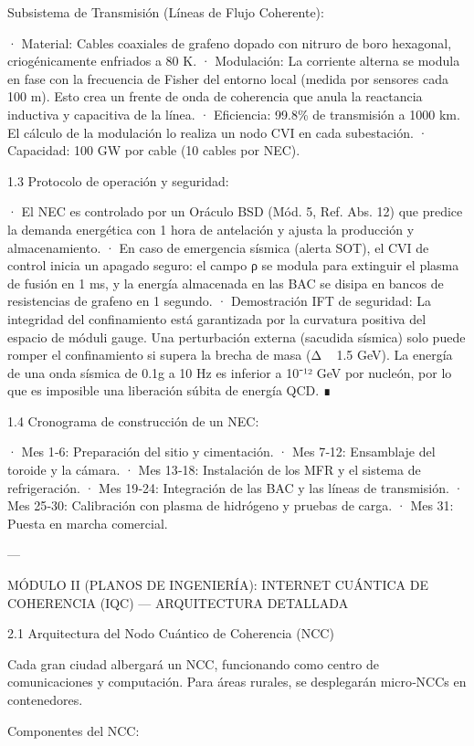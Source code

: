 \documentclass[12pt,twoside]{book}
\begin{document}
Subsistema de Transmisión (Líneas de Flujo Coherente):

· Material: Cables coaxiales de grafeno dopado con nitruro de boro hexagonal, criogénicamente enfriados a 80 K.
· Modulación: La corriente alterna se modula en fase con la frecuencia de Fisher del entorno local (medida por sensores cada 100 m). Esto crea un frente de onda de coherencia que anula la reactancia inductiva y capacitiva de la línea.
· Eficiencia: 99.8\% de transmisión a 1000 km. El cálculo de la modulación lo realiza un nodo CVI en cada subestación.
· Capacidad: 100 GW por cable (10 cables por NEC).

1.3 Protocolo de operación y seguridad:

· El NEC es controlado por un Oráculo BSD (Mód. 5, Ref. Abs. 12) que predice la demanda energética con 1 hora de antelación y ajusta la producción y almacenamiento.
· En caso de emergencia sísmica (alerta SOT), el CVI de control inicia un apagado seguro: el campo ρ se modula para extinguir el plasma de fusión en 1 ms, y la energía almacenada en las BAC se disipa en bancos de resistencias de grafeno en 1 segundo.
· Demostración IFT de seguridad: La integridad del confinamiento está garantizada por la curvatura positiva del espacio de móduli gauge. Una perturbación externa (sacudida sísmica) solo puede romper el confinamiento si supera la brecha de masa (Δ ~ 1.5 GeV). La energía de una onda sísmica de 0.1g a 10 Hz es inferior a 10⁻¹² GeV por nucleón, por lo que es imposible una liberación súbita de energía QCD. ∎

1.4 Cronograma de construcción de un NEC:

· Mes 1‑6: Preparación del sitio y cimentación.
· Mes 7‑12: Ensamblaje del toroide y la cámara.
· Mes 13‑18: Instalación de los MFR y el sistema de refrigeración.
· Mes 19‑24: Integración de las BAC y las líneas de transmisión.
· Mes 25‑30: Calibración con plasma de hidrógeno y pruebas de carga.
· Mes 31: Puesta en marcha comercial.

---

MÓDULO II (PLANOS DE INGENIERÍA): INTERNET CUÁNTICA DE COHERENCIA (IQC) — ARQUITECTURA DETALLADA

2.1 Arquitectura del Nodo Cuántico de Coherencia (NCC)

Cada gran ciudad albergará un NCC, funcionando como centro de comunicaciones y computación. Para áreas rurales, se desplegarán micro‑NCCs en contenedores.

Componentes del NCC:
\end{document}
